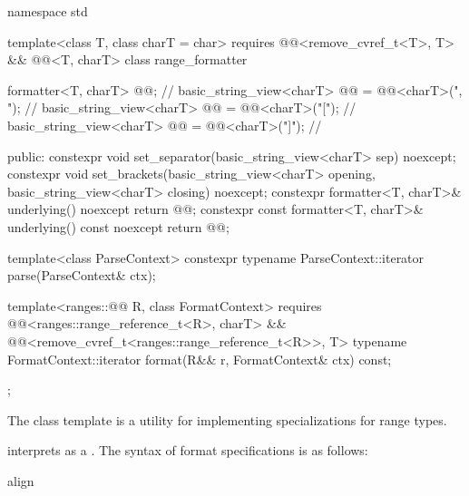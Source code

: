 %
\begin{codeblock}
namespace std {
  template<class T, class charT = char>
    requires @@<remove_cvref_t<T>, T> && @@<T, charT>
  class range_formatter {
    formatter<T, charT> @@;                                          // \expos
    basic_string_view<charT> @@ = @@<charT>(", ");      // \expos
    basic_string_view<charT> @@ = @@<charT>("["); // \expos
    basic_string_view<charT> @@ = @@<charT>("]"); // \expos

  public:
    constexpr void set_separator(basic_string_view<charT> sep) noexcept;
    constexpr void set_brackets(basic_string_view<charT> opening,
                                basic_string_view<charT> closing) noexcept;
    constexpr formatter<T, charT>& underlying() noexcept { return @@; }
    constexpr const formatter<T, charT>& underlying() const noexcept { return @@; }

    template<class ParseContext>
      constexpr typename ParseContext::iterator
        parse(ParseContext& ctx);

    template<ranges::@@ R, class FormatContext>
        requires @@<ranges::range_reference_t<R>, charT> &&
                 @@<remove_cvref_t<ranges::range_reference_t<R>>, T>
      typename FormatContext::iterator
        format(R&& r, FormatContext& ctx) const;
  };
}
\end{codeblock}

\pnum
The class template  is a utility
for implementing  specializations for range types.

\pnum
{} interprets 
as a .
The syntax of format specifications is as follows:

\begin{ncbnf}
\br
        
\end{ncbnf}

\begin{ncbnf}
\br
     align
\end{ncbnf}

